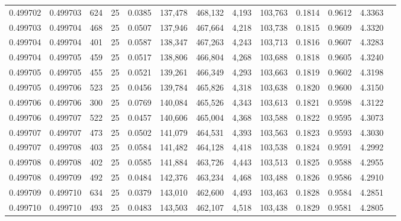 \begin{tabular}{rrrrrrrrrrrrr}
0.499702 & 0.499703 &   624 &  25 &                                     0.0385 & 137,478 & 468,132 &   4,193 & 103,763 & 0.1814 & 0.9612 & 4.3363 \\
0.499703 & 0.499704 &   468 &  25 &                                     0.0507 & 137,946 & 467,664 &   4,218 & 103,738 & 0.1815 & 0.9609 & 4.3320 \\
0.499704 & 0.499704 &   401 &  25 &                                     0.0587 & 138,347 & 467,263 &   4,243 & 103,713 & 0.1816 & 0.9607 & 4.3283 \\
0.499704 & 0.499705 &   459 &  25 &                                     0.0517 & 138,806 & 466,804 &   4,268 & 103,688 & 0.1818 & 0.9605 & 4.3240 \\
0.499705 & 0.499705 &   455 &  25 &                                     0.0521 & 139,261 & 466,349 &   4,293 & 103,663 & 0.1819 & 0.9602 & 4.3198 \\
0.499705 & 0.499706 &   523 &  25 &                                     0.0456 & 139,784 & 465,826 &   4,318 & 103,638 & 0.1820 & 0.9600 & 4.3150 \\
0.499706 & 0.499706 &   300 &  25 &                                     0.0769 & 140,084 & 465,526 &   4,343 & 103,613 & 0.1821 & 0.9598 & 4.3122 \\
0.499706 & 0.499707 &   522 &  25 &                                     0.0457 & 140,606 & 465,004 &   4,368 & 103,588 & 0.1822 & 0.9595 & 4.3073 \\
0.499707 & 0.499707 &   473 &  25 &                                     0.0502 & 141,079 & 464,531 &   4,393 & 103,563 & 0.1823 & 0.9593 & 4.3030 \\
0.499707 & 0.499708 &   403 &  25 &                                     0.0584 & 141,482 & 464,128 &   4,418 & 103,538 & 0.1824 & 0.9591 & 4.2992 \\
0.499708 & 0.499708 &   402 &  25 &                                     0.0585 & 141,884 & 463,726 &   4,443 & 103,513 & 0.1825 & 0.9588 & 4.2955 \\
0.499708 & 0.499709 &   492 &  25 &                                     0.0484 & 142,376 & 463,234 &   4,468 & 103,488 & 0.1826 & 0.9586 & 4.2910 \\
0.499709 & 0.499710 &   634 &  25 &                                     0.0379 & 143,010 & 462,600 &   4,493 & 103,463 & 0.1828 & 0.9584 & 4.2851 \\
0.499710 & 0.499710 &   493 &  25 &                                     0.0483 & 143,503 & 462,107 &   4,518 & 103,438 & 0.1829 & 0.9581 & 4.2805 \\

\end{tabular}
